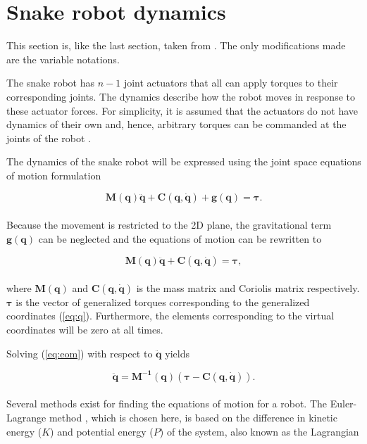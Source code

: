 \section{Snake robot dynamics} \label{sec:dyn}

This section is, like the last section, taken from \cite{AtussaProsjektoppgp}. The only modifications made are the variable notations.

The snake robot has $n-1$ joint actuators that all can apply torques to their corresponding joints. The dynamics describe how the robot moves in response to these actuator forces. For simplicity, it is assumed that the actuators do not have dynamics of their own and, hence, arbitrary torques can be commanded at the joints of the robot \cite{murray2017mathematical}.

The dynamics of the snake robot will be expressed using the joint space equations of motion formulation

\begin{equation}
    \mathbf{M(q)\ddot{q} + C(q, \dot{q}) + g(q)} = \boldsymbol{\tau}.
\end{equation}
\\
Because the movement is restricted to the 2D plane, the gravitational term $\mathbf{g(q)}$ can be neglected and the equations of motion can be rewritten to

\begin{equation}\label{eq:eom}
    \mathbf{M(q)\ddot{q} + C(q, \dot{q})} = \boldsymbol{\tau},
\end{equation}
\\
where $\mathbf{M(q)}$ and $\mathbf{C(q,\dot{q})}$ is the mass matrix and Coriolis matrix respectively.
$\boldsymbol{\tau}$ is the vector of generalized torques corresponding to the generalized coordinates (\ref{eq:q}). Furthermore, the elements corresponding to the virtual coordinates will be zero at all times.

Solving (\ref{eq:eom}) with respect to $\mathbf{\ddot{q}}$ yields

\begin{equation}\label{eq:eom_qdd}
    \mathbf{\ddot{q}} = \mathbf{M^{-1}(q)}( \boldsymbol{\tau} - \mathbf{C(q, \dot{q})}).
\end{equation}
\\
Several methods exist for finding the equations of motion for a robot. The Euler-Lagrange method \cite{lynch2017modern}, which  is chosen here, is based on the difference in kinetic energy ($K$) and potential energy ($P$) of the system, also known as the Lagrangian

